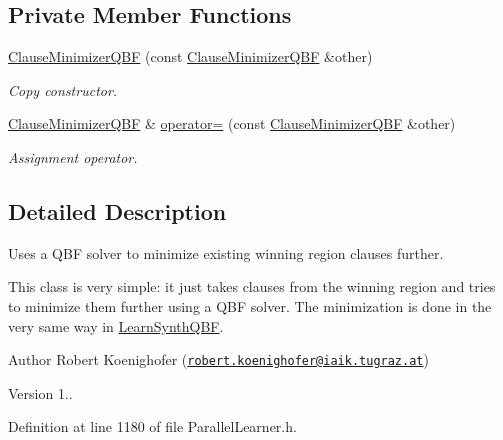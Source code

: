 \subsection*{Private Member Functions}
\begin{DoxyCompactItemize}
\item 
\hyperlink{classClauseMinimizerQBF_ac6392b5d3f312013b93d60d3a6f47283}{Clause\-Minimizer\-Q\-B\-F} (const \hyperlink{classClauseMinimizerQBF}{Clause\-Minimizer\-Q\-B\-F} \&other)
\begin{DoxyCompactList}\small\item\em Copy constructor. \end{DoxyCompactList}\item 
\hyperlink{classClauseMinimizerQBF}{Clause\-Minimizer\-Q\-B\-F} \& \hyperlink{classClauseMinimizerQBF_a42489977ed8a763f6ea8912c6d45218f}{operator=} (const \hyperlink{classClauseMinimizerQBF}{Clause\-Minimizer\-Q\-B\-F} \&other)
\begin{DoxyCompactList}\small\item\em Assignment operator. \end{DoxyCompactList}\end{DoxyCompactItemize}


\subsection{Detailed Description}
Uses a Q\-B\-F solver to minimize existing winning region clauses further. 

This class is very simple\-: it just takes clauses from the winning region and tries to minimize them further using a Q\-B\-F solver. The minimization is done in the very same way in \hyperlink{classLearnSynthQBF}{Learn\-Synth\-Q\-B\-F}.

\begin{DoxyAuthor}{Author}
Robert Koenighofer (\href{mailto:robert.koenighofer@iaik.tugraz.at}{\tt robert.\-koenighofer@iaik.\-tugraz.\-at}) 
\end{DoxyAuthor}
\begin{DoxyVersion}{Version}
1.. 
\end{DoxyVersion}


Definition at line 1180 of file Parallel\-Learner.\-h.



